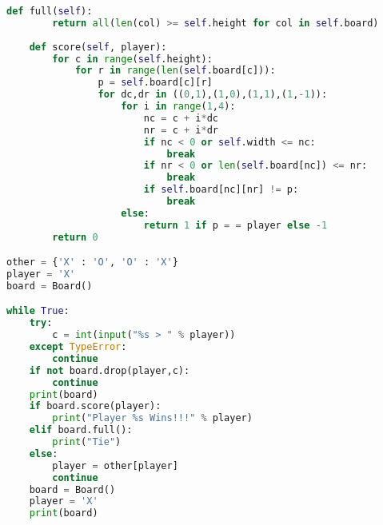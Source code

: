 \documentclass{article}
\begin{document}
{\begin{lstlisting}[language=python]
	def full(self):
		return all(len(col) >= self.height for col in self.board)
	
	def score(self, player):
		for c in range(self.height):
			for r in range(len(self.board[c])):
				p = self.board[c][r]
				for dc,dr in ((0,1),(1,0),(1,1),(1,-1)):
					for i in range(1,4):
						nc = c + i*dc
						nr = c + i*dr
						if nc < 0 or self.width <= nc:
							break
						if nr < 0 or len(self.board[nc]) <= nr:
							break
						if self.board[nc][nr] != p:
							break
					else:
						return 1 if p = = player else -1
		return 0

other = {'X' : 'O', 'O' : 'X'}
player = 'X'
board = Board()

while True:
	try:
		c = int(input("%s > " % player))
	except TypeError:
		continue
	if not board.drop(player,c):
		continue
	print(board)
	if board.score(player):
		print("Player %s Wins!!!" % player)
	elif board.full():
		print("Tie")
	else:
		player = other[player]
		continue
	board = Board()
	player = 'X'
	print(board)
\end{lstlisting}
}
\end{document}
